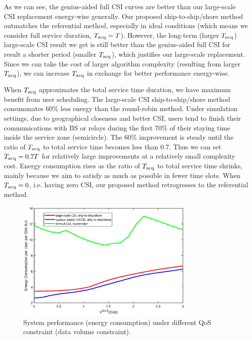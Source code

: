\documentclass[conference]{IEEEtran}
\begin{document}
 As we can see, the genius-aided full CSI curves are better than our large-scale CSI replacement energy-wise generally. Our proposed ship-to-ship/shore method outmatches the referential method, especially in ideal conditions (which means we consider full service duration, ${T_{\rm{acq}}}=T$). 
 However, the long-term (larger $T_{\rm{acq}}$) large-scale CSI result we get is still better than the genius-aided full CSI for result a shorter period (smaller $T_{\rm{acq}}$), which justifies our large-scale replacement. Since we can take the cost of larger algorithm complexity (resulting from larger $T_{\rm{acq}}$), we can increase  $T_{\rm{acq}}$ in exchange for better performance energy-wise. 
 
 When ${T_{\rm{acq}}}$ approximates the total service time duration, we have maximum benefit from user scheduling. The large-scale CSI ship-to-ship/shore method consummates 60\% less energy than the round-robin method. 
 Under simulation settings, due to geographical closeness and better CSI, users tend to finish their communications with BS or relays during the first 70\% of their staying time inside the service zone (semicircle). The 60\% improvement is steady until the ratio of ${T_{\rm{acq}}}$ to total service time becomes less than 0.7. Thus we can set ${T_{\rm{acq}}=0.7T}$ for relatively large improvements at a relatively small complexity cost. 
 Energy consumption rises as the ratio of ${T_{\rm{acq}}}$ to total service time shrinks, mainly because we aim to satisfy as much as possible in fewer time slots. When ${T_{\rm{acq}}} = 0$, i.e. having zero CSI, our proposed method retrogresses to the referential method. 
 
 
 
 \begin{figure} [htb]
 \begin{center}
 \includegraphics*[width=8.8cm]{Cqos.eps}
 \end{center}
 \vspace*{-4mm} 
 \caption{System performance (energy consumption) under different QoS constraint (data volume constraint).}\label{fig:3}
 \vspace*{-2mm} 
 \end{figure}
 
\end{document}
